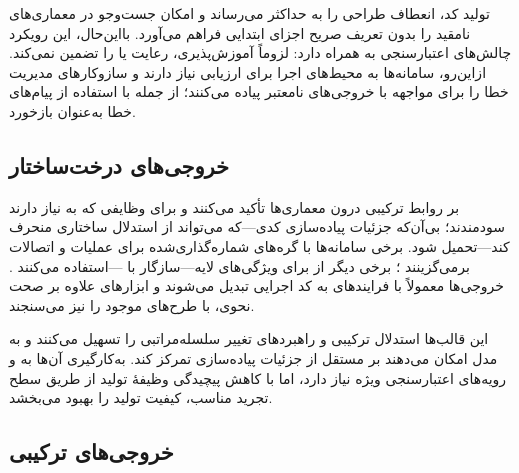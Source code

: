 تولید کد، انعطاف طراحی را به حداکثر می‌رساند و امکان جست‌وجو در معماری‌های نامقید را بدون تعریف صریح اجزای ابتدایی فراهم می‌آورد. بااین‌حال، این رویکرد چالش‌های اعتبارسنجی به همراه دارد:  لزوماً آموزش‌پذیری، رعایت  یا  را تضمین نمی‌کند. ازاین‌رو، سامانه‌ها به محیط‌های اجرا برای ارزیابی نیاز دارند و سازوکارهای مدیریت خطا را برای مواجهه با خروجی‌های نامعتبر پیاده می‌کنند؛ از جمله  با استفاده از پیام‌های خطا به‌عنوان بازخورد.

\subsection{خروجی‌های درخت‌ساختار}

 بر روابط ترکیبی درون معماری‌ها تأکید می‌کنند و برای وظایفی که به  نیاز دارند سودمندند؛ بی‌آن‌که جزئیات پیاده‌سازی کدی—که می‌تواند از استدلال ساختاری منحرف کند—تحمیل شود. برخی سامانه‌ها  با گره‌های شماره‌گذاری‌شده برای عملیات و اتصالات برمی‌گزینند \cite{Yang2025NADER}؛ برخی دیگر از  برای ویژگی‌های لایه—سازگار با —استفاده می‌کنند \cite{Yu2025GPTNAS}. خروجی‌ها معمولاً با فرایندهای  به کد اجرایی تبدیل می‌شوند و ابزارهای  علاوه بر صحت نحوی،  با طرح‌های موجود را نیز می‌سنجند.

این قالب‌ها استدلال ترکیبی و راهبردهای تغییر سلسله‌مراتبی را تسهیل می‌کنند و به مدل امکان می‌دهند بر  مستقل از جزئیات پیاده‌سازی تمرکز کند. به‌کارگیری آن‌ها به  و رویه‌های اعتبارسنجی ویژه نیاز دارد، اما با کاهش پیچیدگی وظیفهٔ تولید از طریق سطح تجرید مناسب، کیفیت تولید را بهبود می‌بخشد.

\subsection{خروجی‌های ترکیبی}

